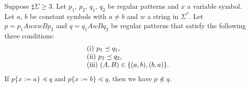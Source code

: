 \begin{lem}\label{Sato1:Lemma13}
    Suppose $\sharp\Sigma \geq 3$.
    Let $p_{1}$, $p_{2}$, $q_{1}$, $q_{2}$ be regular patterns and $x$ a variable symbol.
    Let $a$, $b$ be constant symbols with $a \neq b$ and $w$ a string in $\Sigma^{\ast}$.
    Let $p = p_{1}AwxwBp_{2}$ and $q = q_{1}AwBq_{2}$ be regular patterns that satisfy the following three conditions:
    \[
        \begin{tabular}{ll}
            $\mathrm{(i)}~p_{1} \preceq q_{1}$,  \\
            $\mathrm{(ii)}~p_{2} \preceq q_{2}$, \\
            $\mathrm{(iii)}$ %
            $(A,B)\in \{(a,b),(b,a)\}$.
        \end{tabular}
    \]
    If $p\{x:=a\} \preceq q$ and $p\{x:=b\} \preceq q$,
    then we have $p \not\preceq q$.
\end{lem}






